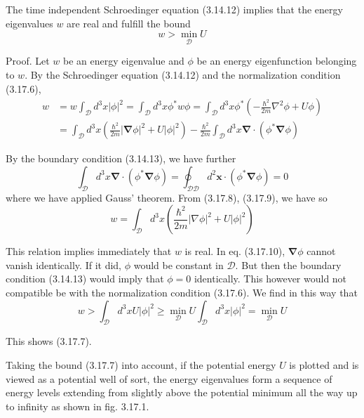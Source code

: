 \documentclass{article}
\begin{document}
The time independent Schroedinger equation (3.14.12) implies that the energy eigenvalues $w$ are real and fulfill the bound
$$
\begin{equation*}
w>\min _{\mathcal{D}} U \tag{3.17.7}
\end{equation*}
$$

Proof. Let $w$ be an energy eigenvalue and $\phi$ be an energy eigenfunction belonging to $w$. By the Schroedinger equation (3.14.12) and the normalization condition (3.17.6),
$$
\begin{align*}
w & =w \int_{\mathcal{D}} d^{3} x|\phi|^{2}=\int_{\mathcal{D}} d^{3} x \phi^{*} w \phi=\int_{\mathcal{D}} d^{3} x \phi^{*}\left(-\frac{\hbar^{2}}{2 m} \nabla^{2} \phi+U \phi\right)  \tag{3.17.8}\\
& =\int_{\mathcal{D}} d^{3} x\left(\frac{\hbar^{2}}{2 m}|\boldsymbol{\nabla} \phi|^{2}+U|\phi|^{2}\right)-\frac{\hbar^{2}}{2 m} \int_{\mathcal{D}} d^{3} x \boldsymbol{\nabla} \cdot\left(\phi^{*} \boldsymbol{\nabla} \phi\right)
\end{align*}
$$

By the boundary condition (3.14.13), we have further
$$
\begin{equation*}
\int_{\mathcal{D}} d^{3} x \boldsymbol{\nabla} \cdot\left(\phi^{*} \boldsymbol{\nabla} \phi\right)=\oint_{\mathcal{D} \mathcal{D}} d^{2} \boldsymbol{x} \cdot\left(\phi^{*} \boldsymbol{\nabla} \phi\right)=0 \tag{3.17.9}
\end{equation*}
$$
where we have applied Gauss' theorem. From (3.17.8), (3.17.9), we have so
$$
\begin{equation*}
w=\int_{\mathcal{D}} d^{3} x\left(\frac{\hbar^{2}}{2 m}|\nabla \phi|^{2}+U|\phi|^{2}\right) \tag{3.17.10}
\end{equation*}
$$

This relation implies immediately that $w$ is real.
In eq. (3.17.10), $\boldsymbol{\nabla} \phi$ cannot vanish identically. If it did, $\phi$ would be constant in $\mathcal{D}$. But then the boundary condition (3.14.13) would imply that $\phi=0$ identically. This however would not compatible be with the normalization condition (3.17.6). We find in this way that
$$
\begin{equation*}
w>\int_{\mathcal{D}} d^{3} x U|\phi|^{2} \geq \min _{\mathcal{D}} U \int_{\mathcal{D}} d^{3} x|\phi|^{2}=\min _{\mathcal{D}} U \tag{3.17.11}
\end{equation*}
$$

This shows (3.17.7).

Taking the bound (3.17.7) into account, if the potential energy $U$ is plotted and is viewed as a potential well of sort, the energy eigenvalues form a sequence of energy levels extending from slightly above the potential minimum all the way up to infinity as shown in fig. 3.17.1.
\end{document}
